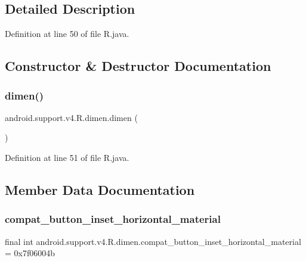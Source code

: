 \subsection{Detailed Description}


Definition at line 50 of file R.\+java.



\subsection{Constructor \& Destructor Documentation}
\mbox{\label{classandroid_1_1support_1_1v4_1_1_r_1_1dimen_a879ccae0fa2bd6502eafe61bbe245c9d}} 
\subsubsection{\texorpdfstring{dimen()}{dimen()}}
{\footnotesize\ttfamily android.\+support.\+v4.\+R.\+dimen.\+dimen (\begin{DoxyParamCaption}{ }\end{DoxyParamCaption})\hspace{0.3cm}{\ttfamily [private]}}



Definition at line 51 of file R.\+java.


\begin{DoxyCode}{0}

\end{DoxyCode}


\subsection{Member Data Documentation}
\mbox{\label{classandroid_1_1support_1_1v4_1_1_r_1_1dimen_a749391e761d0b1564eb37a58de4a1128}} 
\subsubsection{\texorpdfstring{compat\_button\_inset\_horizontal\_material}{compat\_button\_inset\_horizontal\_material}}
{\footnotesize\ttfamily final int android.\+support.\+v4.\+R.\+dimen.\+compat\+\_\+button\+\_\+inset\+\_\+horizontal\+\_\+material = 0x7f06004b\hspace{0.3cm}{\ttfamily [static]}}



